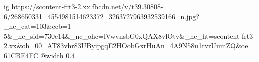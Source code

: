  
 
 
 
 

\ifcmt
  ig https://scontent-frt3-2.xx.fbcdn.net/v/t39.30808-6/268650331_4554981514623372_3263727963932539166_n.jpg?_nc_cat=103&ccb=1-5&_nc_sid=730e14&_nc_ohc=lVwvnsbG0xQAX8vlOtv&_nc_ht=scontent-frt3-2.xx&oh=00_AT83vhr83UByipgqE2HOobGxrHuAn_4A9N58u1rvrUumZQ&oe=61CBF4FC
  @width 0.4
\fi
